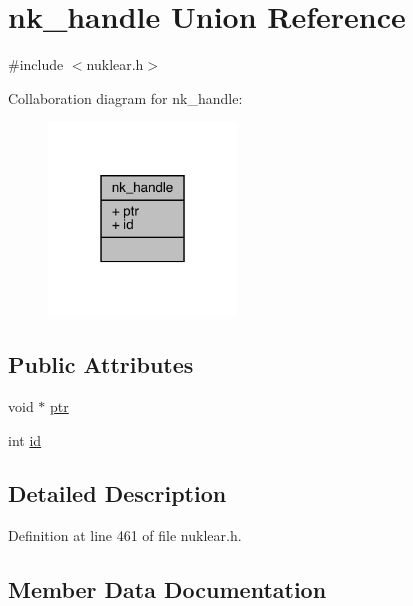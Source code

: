 \hypertarget{unionnk__handle}{}\section{nk\+\_\+handle Union Reference}
\label{unionnk__handle}


{\ttfamily \#include $<$nuklear.\+h$>$}



Collaboration diagram for nk\+\_\+handle\+:
\nopagebreak
\begin{figure}[H]
\begin{center}
\leavevmode
\includegraphics[width=142pt]{unionnk__handle__coll__graph}
\end{center}
\end{figure}
\subsection*{Public Attributes}
\begin{DoxyCompactItemize}
\item 
void $\ast$ \mbox{\hyperlink{unionnk__handle_adbdcd879ad5f3d6cc77b5085bf35ac40}{ptr}}
\item 
int \mbox{\hyperlink{unionnk__handle_ab4db605f712876c795e39598b25ca9b3}{id}}
\end{DoxyCompactItemize}


\subsection{Detailed Description}


Definition at line 461 of file nuklear.\+h.



\subsection{Member Data Documentation}
\mbox{\label{unionnk__handle_ab4db605f712876c795e39598b25ca9b3}} 
